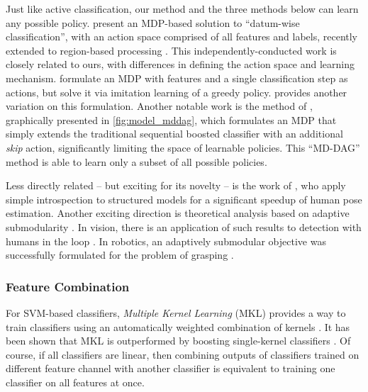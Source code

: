 Just like active classification, our method and the three methods below can learn any possible policy.
\cite{DulacArnold-ML-2012} present an MDP-based solution to ``datum-wise classification'', with an action space comprised of all features and labels, recently extended to region-based processing \parencite{DulacArnold-ICLR-2014}.
This independently-conducted work is closely related to ours, with differences in defining the action space and learning mechanism.
\cite{HeHe-ICMLW-2012} formulate an MDP with features and a single classification step as actions, but solve it via imitation learning of a greedy policy.
\cite{Trapeznikov-ML-2012} provides another variation on this formulation.
Another notable work is the method of \cite{Benbouzid-ICML-2012}, graphically presented in \autoref{fig:model_mddag}, which formulates an MDP that simply extends the traditional sequential boosted classifier with an additional \emph{skip} action, significantly limiting the space of learnable policies.
This ``MD-DAG'' method is able to learn only a subset of all possible policies.

Less directly related -- but exciting for its novelty -- is the work of \parencite{Weiss-ICCV-2013}, who apply simple introspection to structured models for a significant speedup of human pose estimation.
Another exciting direction is theoretical analysis based on adaptive submodularity \parencite{Golovin-and-Krause-2010-JAIR}.
In vision, there is an application of such results to detection with humans in the loop \parencite{Chen-2014-ICML}.
In robotics, an adaptively submodular objective was successfully formulated for the problem of grasping \parencite{Javdani2012}.



\subsubsection{Feature Combination}

For SVM-based classifiers, \emph{Multiple Kernel Learning} (MKL) provides a way to train classifiers using an automatically weighted combination of kernels \parencite{Lanckriet2004}.
It has been shown that MKL is outperformed by boosting single-kernel classifiers \parencite{Gehler2009}.
Of course, if all classifiers are linear, then combining outputs of classifiers trained on different feature channel with another classifier is equivalent to training one classifier on all features at once.

